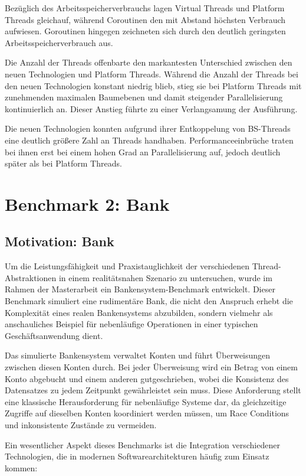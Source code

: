 \documentclass[fontsize=12pt,paper=a4,twoside=semi,parskip=half-,headsepline,headinclude]{scrreprt}
\begin{document}
Bezüglich des Arbeitsspeicherverbrauchs lagen Virtual Threads und Platform Threads gleichauf, während Coroutinen den mit Abstand höchsten Verbrauch aufwiesen. Goroutinen hingegen zeichneten sich durch den deutlich geringsten Arbeitsspeicherverbrauch aus.

Die Anzahl der Threads offenbarte den markantesten Unterschied zwischen den neuen Technologien und Platform Threads. Während die Anzahl der Threads bei den neuen Technologien konstant niedrig blieb, stieg sie bei Platform Threads mit zunehmenden maximalen Baumebenen und damit steigender Parallelisierung kontinuierlich an. Dieser Anstieg führte zu einer Verlangsamung der Ausführung.

Die neuen Technologien konnten aufgrund ihrer Entkoppelung von BS-Threads eine deutlich größere Zahl an Threads handhaben. Performanceeinbrüche traten bei ihnen erst bei einem  hohen Grad an Parallelisierung auf, jedoch deutlich später als bei Platform Threads.

\section{Benchmark 2: Bank}

\subsection{Motivation: Bank}

Um die Leistungsfähigkeit und Praxistauglichkeit der verschiedenen Thread-Abs\-trak\-tio\-nen in einem realitätsnahen Szenario zu untersuchen, wurde im Rahmen der Masterarbeit ein Bankensystem-Bench\-mark entwickelt. Dieser Benchmark simuliert eine rudimentäre Bank, die nicht den Anspruch erhebt die Komplexität eines realen Bankensystems abzubilden, sondern vielmehr als anschauliches Beispiel für nebenläufige Operationen in einer typischen Ge\-schäfts\-an\-wen\-dung dient.

Das simulierte Bankensystem verwaltet Konten und führt Überweisungen zwischen diesen Konten durch. Bei jeder Überweisung wird ein Betrag von einem Konto abgebucht und einem anderen gutgeschrieben, wobei die Konsistenz des Datensatzes zu jedem Zeitpunkt gewährleistet sein muss. Diese Anforderung stellt eine klassische Herausforderung für nebenläufige Systeme dar, da gleichzeitige Zugriffe auf dieselben Konten koordiniert werden müssen, um Race Conditions und inkonsistente Zustände zu vermeiden.

Ein wesentlicher Aspekt dieses Benchmarks ist die Integration verschiedener Technologien, die in modernen Softwarearchitekturen häufig zum Einsatz kommen:
\end{document}
